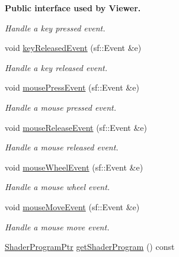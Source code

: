 \begin{Indent}{\bf Public interface used by Viewer.}
\begin{DoxyCompactItemize}
\begin{DoxyCompactList}\small\item\em Handle a key pressed event. \end{DoxyCompactList}\item 
void \hyperlink{classRenderable_a07d0883e8566fa86d224b4d281b373b3}{key\+Released\+Event} (sf\+::\+Event \&e)
\begin{DoxyCompactList}\small\item\em Handle a key released event. \end{DoxyCompactList}\item 
void \hyperlink{classRenderable_a2cc5c2d8476a762be1b0d47425c1149b}{mouse\+Press\+Event} (sf\+::\+Event \&e)
\begin{DoxyCompactList}\small\item\em Handle a mouse pressed event. \end{DoxyCompactList}\item 
void \hyperlink{classRenderable_a1a9c0d11946d3708462b8b4a364ac0d3}{mouse\+Release\+Event} (sf\+::\+Event \&e)
\begin{DoxyCompactList}\small\item\em Handle a mouse released event. \end{DoxyCompactList}\item 
void \hyperlink{classRenderable_a3ee244b2ff6682fb4b4b11b92819c2a2}{mouse\+Wheel\+Event} (sf\+::\+Event \&e)
\begin{DoxyCompactList}\small\item\em Handle a mouse wheel event. \end{DoxyCompactList}\item 
void \hyperlink{classRenderable_aabf21b5d1b75aed4c4f4b9466d658caa}{mouse\+Move\+Event} (sf\+::\+Event \&e)
\begin{DoxyCompactList}\small\item\em Handle a mouse move event. \end{DoxyCompactList}\item 
\hyperlink{ShaderProgram_8hpp_af8e4af1ad4c53875ee5d32ab7e1f4966}{Shader\+Program\+Ptr} \hyperlink{classRenderable_ad6bb136447d0d5968345724d3381714a}{get\+Shader\+Program} () const 
\end{DoxyCompactItemize}
\end{Indent}
